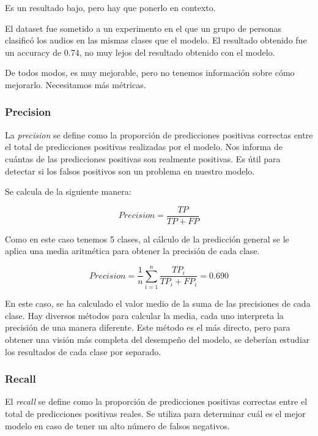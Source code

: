 Es un resultado bajo, pero hay que ponerlo en contexto.

El dataset fue sometido a un experimento en el que un grupo de personas clasificó los audios en las mismas clases que el modelo. \cite{AESDD_webpage}
El resultado obtenido fue un accuracy de 0.74, no muy lejos del resultado obtenido con el modelo.

De todos modos, es muy mejorable, pero no tenemos información sobre cómo mejorarlo.
Necesitamos más métricas.

\subsubsection{Precision}\label{seccion:precision}
La \textit{precision} se define como la proporción de predicciones positivas correctas entre el total de predicciones positivas realizadas por el modelo.
Nos informa de cuántas de las predicciones positivas son realmente positivas.
Es útil para detectar si los falsos positivos son un problema en nuestro modelo.

Se calcula de la siguiente manera:

\begin{equation}
    Precision = \frac{TP}{TP + FP}
\end{equation}

Como en este caso tenemos 5 clases, al cálculo de la predicción general se le aplica una media aritmética para obtener la precisión de cada clase.

\begin{equation}
    Precision = \frac{1}{n} \sum_{i=1}^{n} \frac{TP_i}{TP_i + FP_i} = 0.690
\end{equation}

En este caso, se ha calculado el valor medio de la suma de las precisiones de cada clase.
Hay diversos métodos para calcular la media, cada uno interpreta la precisión de una manera diferente.
Este método es el más directo, pero para obtener una visión más completa del desempeño del modelo, se deberían estudiar los resultados de cada clase por separado.

\subsubsection{Recall}\label{seccion:recall}
El \textit{recall} se define como la proporción de predicciones positivas correctas entre el total de predicciones positivas reales.
Se utiliza para determinar cuál es el mejor modelo en caso de tener un alto número de falsos negativos.

